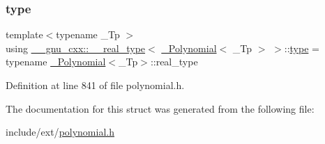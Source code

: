 \subsubsection{\texorpdfstring{type}{type}}
{\footnotesize\ttfamily template$<$typename \+\_\+\+Tp $>$ \\
using \hyperlink{struct____gnu__cxx_1_1____real__type}{\+\_\+\+\_\+gnu\+\_\+cxx\+::\+\_\+\+\_\+real\+\_\+type}$<$ \hyperlink{class____gnu__cxx_1_1__Polynomial}{\+\_\+\+Polynomial}$<$ \+\_\+\+Tp $>$ $>$\+::\hyperlink{struct____gnu__cxx_1_1____real__type_3_01__Polynomial_3_01__Tp_01_4_01_4_ac0fd9a1c448f5e710c2df57e1c3a3f54}{type} =  typename \hyperlink{class____gnu__cxx_1_1__Polynomial}{\+\_\+\+Polynomial}$<$\+\_\+\+Tp$>$\+::real\+\_\+type}



Definition at line 841 of file polynomial.\+h.



The documentation for this struct was generated from the following file\+:\begin{DoxyCompactItemize}
\item 
include/ext/\hyperlink{polynomial_8h}{polynomial.\+h}\end{DoxyCompactItemize}
